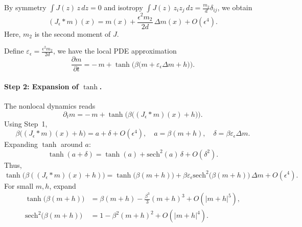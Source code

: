 \documentclass[11pt,a4paper]{article}
\begin{document}
By symmetry $\int J(z)\,z\,dz = 0$ and isotropy 
$\int J(z)\, z_i z_j\,dz = \frac{m_2}{d}\delta_{ij}$, we obtain
\begin{equation}
    (J_\epsilon * m)(x) = m(x) + \frac{\epsilon^2 m_2}{2d}\,\Delta m(x) + O(\epsilon^4).
\end{equation}
Here, $m_2$ is the second moment of $J$.

Define $\varepsilon_\epsilon = \frac{\epsilon^2 m_2}{2d}$, we have the local PDE approximation
\begin{equation}
    \label{eq:local_tanh}
    \frac{\partial m}{\partial t} = -\,m + \tanh\!\Big(\beta\big(m + \varepsilon_\epsilon \Delta m + h\big)\Big).
\end{equation}

\paragraph{Step 2: Expansion of $\tanh$.}
The nonlocal dynamics reads
\begin{equation}
\partial_t m = -\,m + \tanh\!\Big(\beta\big((J_\epsilon * m)(x) + h\big)\Big).
\end{equation}
Using Step~1,
\begin{equation}  
\beta\big((J_\epsilon*m)(x) + h\big) = a + \delta + O(\epsilon^4),
\quad a = \beta(m+h), \quad \delta = \beta \varepsilon_\epsilon \Delta m.
\end{equation}
Expanding $\tanh$ around $a$:
\begin{equation}
\tanh(a+\delta) 
= \tanh(a) + \text{sech}^2(a)\,\delta + O(\delta^2).
\end{equation}
Thus,
\begin{equation}
\tanh\!\Big(\beta((J_\epsilon*m)(x) + h)\Big) 
= \tanh\!\big(\beta(m+h)\big) 
+ \beta \varepsilon_\epsilon \text{sech}^2\!\big(\beta(m+h)\big)\,\Delta m
+ O(\epsilon^4).
\end{equation}
For small $m,h$, expand
\begin{equation}
    \begin{split}
\tanh\!\big(\beta(m+h)\big) 
&= \beta(m+h) - \frac{\beta^3}{3}(m+h)^3 + O(|m+h|^5),\\
\text{sech}^2\!\big(\beta(m+h)\big) 
&= 1 - \beta^2(m+h)^2 + O(|m+h|^4).
    \end{split}
\end{equation}
\end{document}

